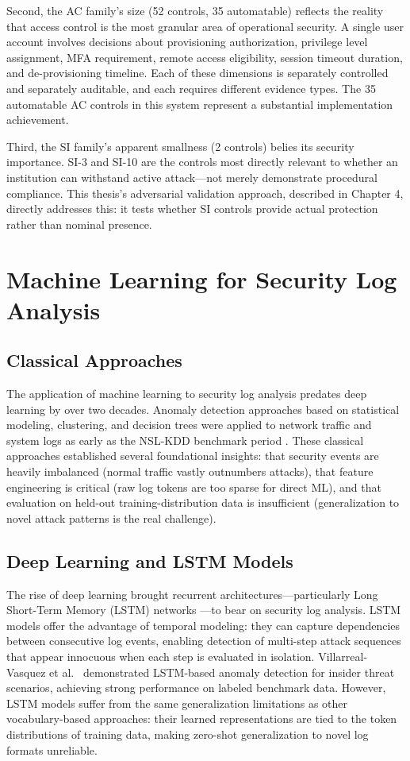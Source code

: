 \documentclass[12pt,oneside]{report}
\begin{document}
Second, the AC family's size (52 controls, 35 automatable) reflects the reality that access control is the most granular area of operational security. A single user account involves decisions about provisioning authorization, privilege level assignment, MFA requirement, remote access eligibility, session timeout duration, and de-provisioning timeline. Each of these dimensions is separately controlled and separately auditable, and each requires different evidence types. The 35 automatable AC controls in this system represent a substantial implementation achievement.

Third, the SI family's apparent smallness (2 controls) belies its security importance. SI-3 and SI-10 are the controls most directly relevant to whether an institution can withstand active attack—not merely demonstrate procedural compliance. This thesis's adversarial validation approach, described in Chapter 4, directly addresses this: it tests whether SI controls provide actual protection rather than nominal presence.

\section{Machine Learning for Security Log Analysis}

\subsection{Classical Approaches}

The application of machine learning to security log analysis predates deep learning by over two decades. Anomaly detection approaches based on statistical modeling, clustering, and decision trees were applied to network traffic and system logs as early as the NSL-KDD benchmark period \cite{nslkdd}. These classical approaches established several foundational insights: that security events are heavily imbalanced (normal traffic vastly outnumbers attacks), that feature engineering is critical (raw log tokens are too sparse for direct ML), and that evaluation on held-out training-distribution data is insufficient (generalization to novel attack patterns is the real challenge).

\subsection{Deep Learning and LSTM Models}

The rise of deep learning brought recurrent architectures—particularly Long Short-Term Memory (LSTM) networks \cite{lstm_audit}—to bear on security log analysis. LSTM models offer the advantage of temporal modeling: they can capture dependencies between consecutive log events, enabling detection of multi-step attack sequences that appear innocuous when each step is evaluated in isolation. Villarreal-Vasquez et al.\ \cite{lstm_audit} demonstrated LSTM-based anomaly detection for insider threat scenarios, achieving strong performance on labeled benchmark data. However, LSTM models suffer from the same generalization limitations as other vocabulary-based approaches: their learned representations are tied to the token distributions of training data, making zero-shot generalization to novel log formats unreliable.
\end{document}
